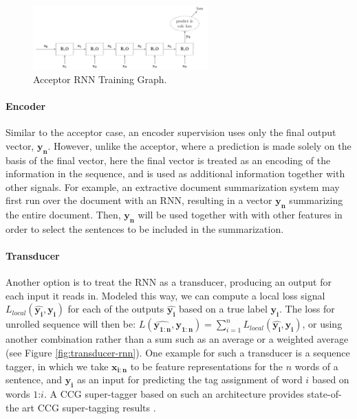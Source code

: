 \documentclass[jair,twoside,11pt,theapa]{article}
\newcommand{\m}[1]{\mathbf{#1}}%
\begin{document}
{\begin{figure}[ht]
    \begin{center}
    \includegraphics[width=0.6\textwidth]{acceptor-rnn.pdf} 
    \end{center}
    \caption{Acceptor RNN Training Graph.}
    \label{fig:acceptor-rnn}
\end{figure}

\paragraph{Encoder} Similar to the acceptor case, an encoder supervision uses only the final output
vector, $\m{y_n}$. However, unlike the acceptor, where a prediction is made solely on the basis of
the final vector, here the final vector is treated as an encoding of the information in the sequence,
and is used as additional information together with other signals.  For example, an extractive document
summarization system may first run over the document with an RNN, resulting in a
vector $\m{y_n}$ summarizing the entire document.  Then, $\m{y_n}$ will be used
together with with other features in order to select the sentences to be included in the summarization.

\paragraph{Transducer} Another option is to treat the RNN as a transducer,
producing an output for each input it reads in. Modeled this way, we can compute
a local loss signal $L_{local}(\m{\hat{y_i}},\m{y_i})$ for each of the outputs
$\m{\hat{y_i}}$ based on a true label $\m{y_i}$. The loss for unrolled sequence
will then be: $L(\m{\hat{y_{1:n}}},\m{y_{1:n}}) =
\sum_{i=1}^{n}{L_{local}(\m{\hat{y_i}},\m{y_i})}$, or using another combination rather
than a sum such as an average or a weighted average (see Figure
\ref{fig:transducer-rnn}). One example for such a
transducer is a sequence tagger, in which we take $\m{x_{i:n}}$ to be feature
representations for the $n$ words of a sentence, and $\m{y_i}$ as an input for
predicting the tag
assignment of word $i$ based on words $1$:$i$. 
A CCG super-tagger based on such an 
architecture provides state-of-the art CCG super-tagging results
\cite{xu2015ccg}.

}
\end{document}

